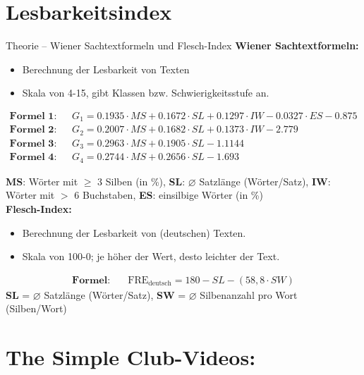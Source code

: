 \documentclass[a4paper,10pt,
headsepline,           %
oneside,               %
pointlessnumbers,      %
bibtotoc,              %
DIV=15,               %
]{scrbook}
\begin{document}
\section*{Lesbarkeitsindex}
\begin{definition}{Theorie -- Wiener Sachtextformeln und Flesch-Index}
\textbf{Wiener Sachtextformeln:}
\begin{itemize}
    \item Berechnung der Lesbarkeit von Texten
    \item Skala von 4-15, gibt Klassen bzw. Schwierigkeitsstufe an.
\end{itemize}
            \begin{align*}
                \textbf{Formel 1}: & \quad G_1 = 0.1935 \cdot MS + 0.1672 \cdot SL + 0.1297 \cdot IW - 0.0327 \cdot ES - 0.875 \\
                \textbf{Formel 2}: & \quad G_2 = 0.2007 \cdot MS + 0.1682 \cdot SL + 0.1373 \cdot IW - 2.779 \\
                \textbf{Formel 3}: & \quad G_3 = 0.2963 \cdot MS + 0.1905 \cdot SL - 1.1144 \\
                \textbf{Formel 4}: & \quad G_4 = 0.2744 \cdot MS + 0.2656 \cdot SL - 1.693
            \end{align*}



      {\scriptsize  \textbf{MS}: Wörter mit $\geq $ 3 Silben (in \%),
        \textbf{SL}: $\varnothing $ Satzlänge (Wörter/Satz),
        \textbf{IW}: Wörter mit $>$ 6 Buchstaben,
        \textbf{ES}: einsilbige Wörter (in \%)}
\ \\[0.25em]
\textbf{Flesch-Index:}
\begin{itemize}
    \item Berechnung der Lesbarkeit von (deutschen) Texten.
    \item Skala von 100-0; je höher der Wert, desto leichter der Text.
\end{itemize}
\begin{align*}
    \textbf{Formel}: & \quad \text{FRE}_{\text{deutsch}} = 180 - SL - (58{,}8 \cdot SW)
\end{align*}
{\scriptsize \textbf{SL} = $\varnothing $ Satzlänge (Wörter/Satz), \textbf{SW} = $\varnothing $ Silbenanzahl pro Wort (Silben/Wort)}
\end{definition}

\section*{The Simple Club-Videos:}
\end{document}
